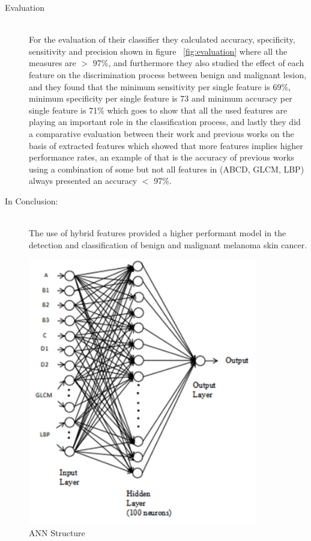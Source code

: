 \begin{description}
    \item [Evaluation] \hfill \\
        For the evaluation of their classifier they calculated accuracy, specificity, sensitivity and precision shown in figure ~\ref{fig:evaluation}  where all the measures are $>$ 97\%, and furthermore they also studied the effect of each feature on the discrimination process between benign and malignant lesion, and they found that the minimum sensitivity per single feature is 69\%, minimum specificity per single feature is 73 and minimum accuracy per single feature is 71\% which goes to show that all the used features are playing an important role in the classification process, and lastly they did a comparative evaluation between their work and previous works on the basis of extracted features which showed that more features implies higher performance rates, an example of that is the accuracy of previous works using a combination of some but not all features in (ABCD, GLCM, LBP) always presented an accuracy $<$ 97\%.

    \item [In Conclusion: ] \hfill \\
    The use of hybrid features provided a higher performant model in the detection and classification of benign and malignant melanoma skin cancer.
    \end{description}


\begin{figure}[htbp]
\begin{center}
\includegraphics[width=10cm]{./chapter-03-state-of-the-art/ann.png}
\end{center}
\caption{ANN Structure}
\label{fig:ann}
\end{figure}

